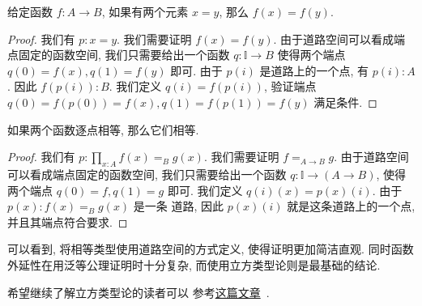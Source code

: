 \begin{theorem}
给定函数 \(f : A \to B\), 如果有两个元素 \(x = y\), 那么
\(f(x) = f(y)\).
\end{theorem}
\begin{proof}
我们有 \(p : x = y\). 我们需要证明 \(f(x) = f(y)\).
由于道路空间可以看成端点固定的函数空间, 我们只需要给出一个函数
\(q : \mathbb I \to B\) 使得两个端点 \(q(0) = f(x),
q(1) = f(y)\) 即可. 由于 \(p(i)\) 是道路上的一个点, 有
\(p(i) : A\). 因此 \(f(p(i)) : B\). 我们定义 \(q(i) = f(p(i))\),
验证端点 \(q(0) = f(p(0)) = f(x), q(1) = f(p(1)) = f(y)\)
满足条件.
\end{proof}

\begin{theorem}
如果两个函数逐点相等, 那么它们相等.
\end{theorem}
\begin{proof}
我们有 \(p : \prod_{x : A} f(x) =_B g(x)\). 我们需要证明
\(f =_{A\to B} g\). 由于道路空间可以看成端点固定的函数空间,
我们只需要给出一个函数 \(q : \mathbb I \to (A \to B)\), 使得
两个端点 \(q(0) = f, q(1) = g\) 即可. 我们定义
\(q(i)(x) = p(x)(i)\). 由于 \(p(x) : f(x) =_B g(x)\) 是一条
道路, 因此 \(p(x)(i)\) 就是这条道路上的一个点, 并且其端点符合要求.
\end{proof}

可以看到, 将相等类型使用道路空间的方式定义, 使得证明更加简洁直观.
同时函数外延性在用泛等公理证明时十分复杂, 而使用立方类型论则是最基础的结论.


希望继续了解立方类型论的读者可以
参考\href{https://1lab.dev/1Lab.intro.html}{这篇文章}~\cite{amelia:2023:1lab}.
